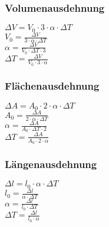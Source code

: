 \subsubsection{Volumenausdehnung} 
\begin{minipage}{0.45\textwidth} 
$ \Delta V = V_{0} \cdot 3\cdot \alpha \cdot \Delta T $\\ 
$ V_{0}  = \frac{  \Delta V}{3\cdot \alpha \cdot \Delta T} $\\ 
$ \alpha  = \frac{  \Delta V}{V_{0} \cdot \Delta T\cdot 3} $\\ 
$ \Delta T = \frac{  \Delta V}{V_{0} \cdot 3\cdot \alpha } $\\ 
\end{minipage} 
\begin{minipage}{0.45\textwidth} 
 
\end{minipage} 
\subsubsection{Flächenausdehnung} 
\begin{minipage}{0.45\textwidth} 
$ \Delta A = A_{0} \cdot 2\cdot \alpha \cdot \Delta T $\\ 
$ A_{0}  = \frac{ \Delta A}{2\cdot \alpha \cdot \Delta T} $\\ 
$ \alpha  = \frac{ \Delta A}{A_{0} \cdot \Delta T\cdot 2} $\\ 
$ \Delta T = \frac{ \Delta A}{A_{0} \cdot 2\cdot \alpha } $\\ 
\end{minipage} 
\begin{minipage}{0.45\textwidth} 
 
\end{minipage} 
\subsubsection{Längenausdehnung} 
\begin{minipage}{0.45\textwidth} 
$ \Delta l = l_{0} \cdot \alpha \cdot \Delta T $\\ 
$ l_{0}  = \frac{ \Delta l}{\alpha \cdot \Delta T} $\\ 
$ \alpha  = \frac{ \Delta l}{l_{0} \cdot \Delta T} $\\ 
$ \Delta T = \frac{ \Delta l}{l_{0} \cdot \alpha } $\\ 
\end{minipage} 
\begin{minipage}{0.45\textwidth} 
 
\end{minipage} 

